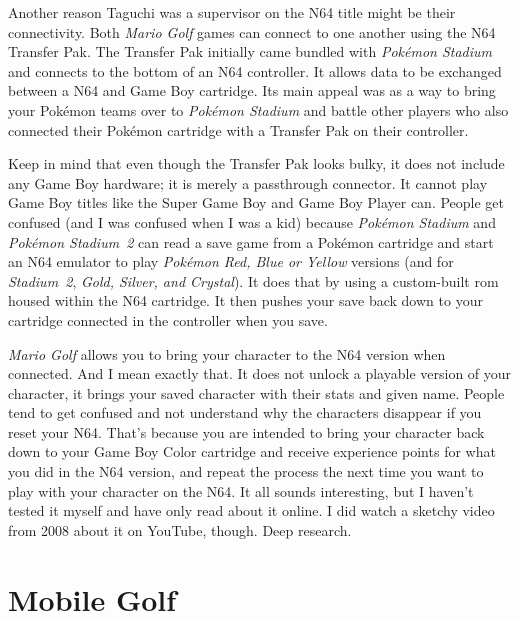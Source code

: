 \documentclass{book}
\begin{document}
Another reason Taguchi was a supervisor on the N64 title might be their connectivity. Both \emph{Mario Golf} games can connect to one another using the N64 Transfer Pak. The Transfer Pak initially came bundled with \emph{Pokémon Stadium} and connects to the bottom of an N64 controller. It allows data to be exchanged between a N64 and Game Boy cartridge. Its main appeal was as a way to bring your Pokémon teams over to \emph{Pokémon Stadium} and battle other players who also connected their Pokémon cartridge with a Transfer Pak on their controller.\par
\FloatBarrier\vspace{\baselineskip}\begin{figure}[H]\end{figure}
Keep in mind that even though the Transfer Pak looks bulky, it does not include any Game Boy hardware; it is merely a passthrough connector. It cannot play Game Boy titles like the Super Game Boy and Game Boy Player can. People get confused (and I was confused when I was a kid) because \emph{Pokémon Stadium} and \emph{Pokémon Stadium~2} can read a save game from a Pokémon cartridge and start an N64 emulator to play \emph{Pokémon Red, Blue or Yellow} versions (and for \emph{Stadium~2}, \emph{Gold, Silver, and Crystal}). It does that by using a custom-built rom housed within the N64 cartridge. It then pushes your save back down to your cartridge connected in the controller when you save.\par
\emph{Mario Golf} allows you to bring your character to the N64 version when connected. And I mean exactly that. It does not unlock a playable version of your character, it brings your saved character with their stats and given name. People tend to get confused and not understand why the characters disappear if you reset your N64. That’s because you are intended to bring your character back down to your Game Boy Color cartridge and receive experience points for what you did in the N64 version, and repeat the process the next time you want to play with your character on the N64. It all sounds interesting, but I haven’t tested it myself and have only read about it online. I did watch a sketchy video from 2008 about it on YouTube, though. Deep research.\par
\FloatBarrier\section*{Mobile Golf}
\end{document}
